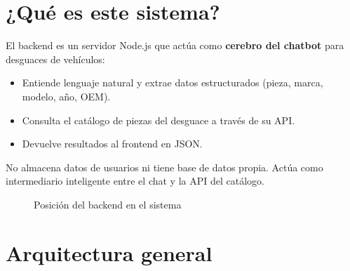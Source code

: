 \documentclass[12pt, a4paper]{article}
\begin{document}
\tableofcontents
\newpage

\section{¿Qué es este sistema?}

El backend es un servidor Node.js que actúa como \textbf{cerebro del chatbot} para desguaces de vehículos:

\begin{itemize}[noitemsep]
  \item Entiende lenguaje natural y extrae datos estructurados (pieza, marca, modelo, año, OEM).
  \item Consulta el catálogo de piezas del desguace a través de su API.
  \item Devuelve resultados al frontend en JSON.
\end{itemize}

No almacena datos de usuarios ni tiene base de datos propia. Actúa como intermediario inteligente entre el chat y la API del catálogo.

\begin{figure}[h]
\centering
{}
\caption{Posición del backend en el sistema}
\end{figure}

\section{Arquitectura general}
\end{document}
